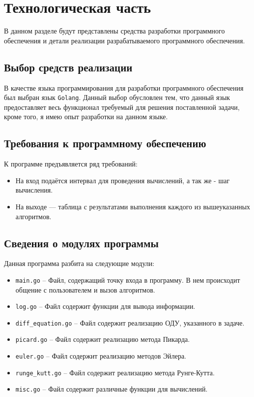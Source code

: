 \chapter{Технологическая часть}

В данном разделе будут представлены средства разработки программного обеспечения и детали реализации разрабатываемого программного обеспечения.

\section{Выбор средств реализации}

В качестве языка программирования для разработки программного обеспечения был выбран язык \texttt{Golang}. Данный выбор обусловлен тем, что данный язык предоставляет весь функционал требуемый для решения поставленной задачи, кроме того, я имею опыт разработки на данном языке.

\section{Требования к программному обеспечению}

К программе предъявляется ряд требований:
\begin{itemize}
	\item На вход подаётся интервал для проведения вычислений, а так же - шаг вычисления.
	\item На выходе — таблица с результатами выполнения каждого из вышеуказанных алгоритмов.
\end{itemize}

\section{Сведения о модулях программы}

Данная программа разбита на следующие модули:
\begin{itemize}
\item \texttt{main.go} -- Файл, содержащий точку входа в программу. В нем происходит общение с пользователем и вызов алгоритмов.
\item \texttt{log.go} -- Файл содержит функции для вывода информации.
\item \texttt{diff\_equation.go} -- Файл содержит реализацию ОДУ, указанного в задаче.
\item \texttt{picard.go} -- Файл содержит реализацию метода Пикарда.
\item \texttt{euler.go} -- Файл содержит реализацию методов Эйлера.
\item \texttt{runge\_kutt.go} -- Файл содержит реализацию метода Рунге-Кутта.
\item \texttt{misc.go} -- Файл содержит различные функции для вычислений.
\end{itemize}

